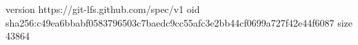 version https://git-lfs.github.com/spec/v1
oid sha256:c49ea6bbabf0583796503c7baedc9cc55afc3e2bb44cf0699a727f42e44f6087
size 43864
